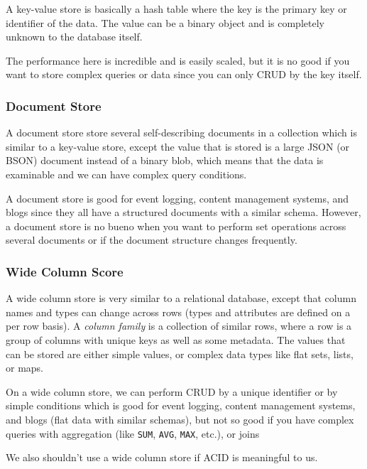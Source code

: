 A key-value store is basically a hash table where the key is the primary key or identifier of the data.
The value can be a binary object and is completely unknown to the database itself.

The performance here is incredible and is easily scaled, but it is no good if you want to store complex queries or data since you can only CRUD by the key itself.

\subsubsection{Document Store}\label{ssub:document_store}

A document store store several self-describing documents in a collection which is similar to a key-value store, except the value that is stored is a large JSON (or BSON) document instead of a binary blob, which means that the data is examinable and we can have complex query conditions.

A document store is good for event logging, content management systems, and blogs since they all have a structured documents with a similar schema.
However, a document store is no bueno when you want to perform set operations across several documents or if the document structure changes frequently.

\subsubsection{Wide Column Score}\label{ssub:wide_column_score}

A wide column store is very similar to a relational database, except that column names and types can change across rows (types and attributes are defined on a per row basis).
A \emph{column family} is a collection of similar rows, where a row is a group of columns with unique keys as well as some metadata.
The values that can be stored are either simple values, or complex data types like flat sets, lists, or maps.

On a wide column store, we can perform CRUD by a unique identifier or by simple conditions which is good for event logging, content management systems, and blogs (flat data with similar schemas), but not so good if you have complex queries with aggregation (like \texttt{SUM}, \texttt{AVG}, \texttt{MAX}, etc.), or joins

\begin{note}
    We also shouldn't use a wide column store if ACID is meaningful to us.
\end{note}

